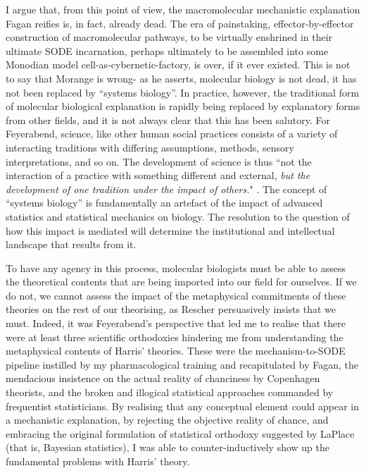 I argue that, from this point of view, the macromolecular mechanistic explanation Fagan reifies is, in fact, already dead. The era of painstaking, effector-by-effector construction of macromolecular pathways, to be virtually enshrined in their ultimate SODE incarnation, perhaps ultimately to be assembled into some Monodian model cell-as-cybernetic-factory, is over, if it ever existed. This is not to say that Morange is wrong- as he asserts, molecular biology is not dead, it has not been replaced by ``systems biology''. In practice, however, the traditional form of molecular biological explanation is rapidly being replaced by explanatory forms from other fields, and it is not always clear that this has been salutory. For Feyerabend, science, like other human social practices consists of a variety of interacting traditions with differing assumptions, methods, sensory interpretations, and so on. The development of science is thus ``not the interaction of a practice with something different and external, \textit{but the development of one tradition under the impact of others.}" \cite[p.232]{Feyerabend1993}. The concept of ``systems biology'' is fundamentally an artefact of the impact of advanced statistics and statistical mechanics on biology. The resolution to the question of how this impact is mediated will determine the institutional and intellectual landscape that results from it. 

To have any agency in this process, molecular biologists must be able to assess the theoretical contents that are being imported into our field for ourselves. If we do not, we cannot assess the impact of the metaphysical commitments of these theories on the rest of our theorising, as Rescher persuasively insists that we must. Indeed, it was Feyerabend's perspective that led me to realise that there were at least three scientific orthodoxies hindering me from understanding the metaphysical contents of Harris' theories. These were the mechanism-to-SODE pipeline instilled by my pharmacological training and recapitulated by Fagan, the mendacious insistence on the actual reality of chanciness by Copenhagen theorists, and the broken and illogical statistical approaches commanded by frequentist statisticians. By realising that any conceptual element could appear in a mechanistic explanation, by rejecting the objective reality of chance, and embracing the original formulation of statistical orthodoxy suggested by LaPlace (that is, Bayesian statistics), I was able to counter-inductively show up the fundamental problems with Harris' theory.

